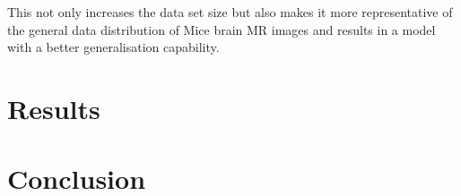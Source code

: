 \documentclass{article}
\begin{document}


This not only increases the data set size but also makes it more representative of the general data distribution of Mice brain MR images and results in a model with a better generalisation capability.

\section{Results}

\section{Conclusion}




\end{document}
